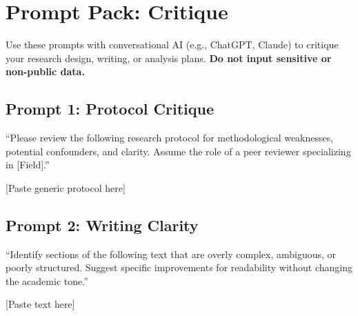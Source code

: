 \documentclass[
]{report}
\author{}
\date{}
\renewcommand*\contentsname{Table of contents}
\newcommand\contentsname{Table of contents}
\begin{document}
\renewcommand*\contentsname{Table of contents}
{
\hypersetup{linkcolor=}
\setcounter{tocdepth}{2}
\tableofcontents
}

\chapter{Prompt Pack: Critique}\label{prompt-pack-critique}

Use these prompts with conversational AI (e.g., ChatGPT, Claude) to
critique your research design, writing, or analysis plans. \textbf{Do
not input sensitive or non-public data.}

\section{Prompt 1: Protocol Critique}\label{prompt-1-protocol-critique}

``Please review the following research protocol for methodological
weaknesses, potential confounders, and clarity. Assume the role of a
peer reviewer specializing in {[}Field{]}.''

{[}Paste generic protocol here{]}

\section{Prompt 2: Writing Clarity}\label{prompt-2-writing-clarity}

``Identify sections of the following text that are overly complex,
ambiguous, or poorly structured. Suggest specific improvements for
readability without changing the academic tone.''

{[}Paste text here{]}
\end{document}
